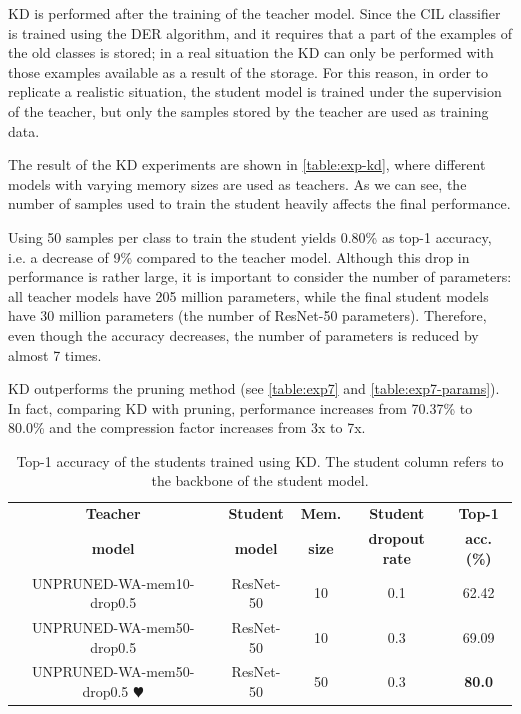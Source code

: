 KD is performed after the training of the teacher model.
Since the CIL classifier is trained using the DER algorithm, and it requires that a part of the examples of the old classes is stored; in a real situation the KD can only be performed with those examples available as a result of the storage.
For this reason, in order to replicate a realistic situation, the student model is trained under the supervision of the teacher, but only the samples stored by the teacher are used as training data.

The result of the KD experiments are shown in \autoref{table:exp-kd}, where different models with varying memory sizes are used as teachers. As we can see, the number of samples used to train the student heavily affects the final performance.

Using 50 samples per class to train the student yields 0.80\% as top-1 accuracy, i.e. a decrease of 9\% compared to the teacher model.
Although this drop in performance is rather large, it is important to consider the number of parameters: all teacher models have 205 million parameters, while the final student models have 30 million parameters (the number of ResNet-50 parameters).
Therefore, even though the accuracy decreases, the number of parameters is reduced by almost 7 times.

KD outperforms the pruning method (see \autoref{table:exp7} and \autoref{table:exp7-params}). In fact, comparing KD with pruning, performance increases from 70.37\% to 80.0\% and the compression factor increases from 3x to 7x.

\begin{table}[H]
    \centering
    \begin{tabular}{c|c|c|c|c}
        \hline
        \textbf{Teacher} &
        \textbf{Student} &
        \textbf{Mem.} &
        \textbf{Student} &
        \textbf{Top-1} \\
        \textbf{model} &
        \textbf{model} &
        \textbf{size} &
        \textbf{dropout rate} &
        \textbf{acc. (\%)} \\
        \hline
        \hline
UNPRUNED-WA-mem10-drop0.5&ResNet-50&10&0.1&62.42\\
UNPRUNED-WA-mem50-drop0.5&ResNet-50&10&0.3&69.09\\
UNPRUNED-WA-mem50-drop0.5 $\varheartsuit$&ResNet-50&50&0.3&\textbf{80.0}\\
\hline
\end{tabular}
\caption{Top-1 accuracy of the students trained using KD. The student column refers to the backbone of the student model.}
    \label{table:exp-kd}
\end{table}



